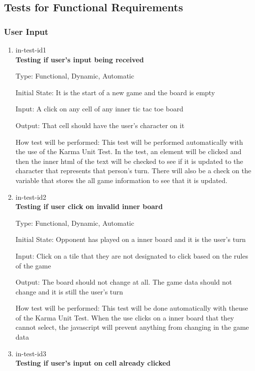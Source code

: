\documentclass[12pt, titlepage]{article}
\begin{document}
\subsection{Tests for Functional Requirements}

\subsubsection{User Input}

\begin{enumerate}

\item{in-test-id1\\}
\textbf {Testing if user's input being received}

Type: Functional, Dynamic, Automatic
					
Initial State: It is the start of a new game and the board is empty
					
Input: A click on any cell of any inner tic tac toe board
					
Output: That cell should have the user's character on it
					
How test will be performed: This test will be performed automatically with the use of the Karma Unit Test. In the test, an element will be clicked and then the inner html of the text will be checked to see if it is updated to the character that represents that person's turn. There will also be a check on the variable that stores the all game information to see that it is updated.
					
\item{in-test-id2\\}
\textbf{Testing if user click on invalid inner board}

Type: Functional, Dynamic, Automatic
					
Initial State: Opponent has played on a inner board and it is the user's turn

Input: Click on a tile that they are not designated to click based on the rules of the game
					
Output: The board should not change at all. The game data should not change and it is still the user's turn
					
How test will be performed: This test will be done automatically with theuse of the Karma Unit Test. When the use clicks on a inner board that they cannot select, the javascript will prevent anything from changing in the game data

\item{in-test-id3\\}
\textbf{Testing if user's input on cell already clicked}


\end{enumerate}
\end{document}
